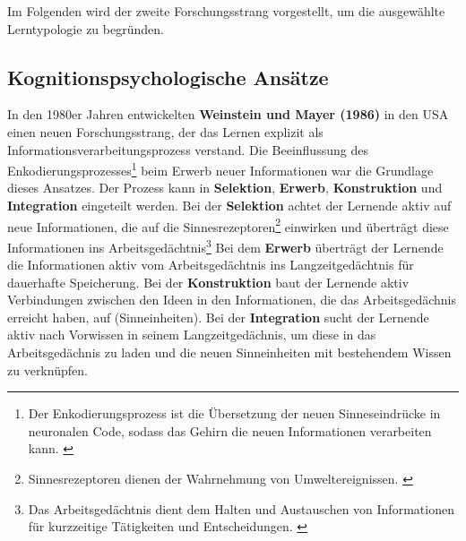         Im Folgenden wird der zweite Forschungsstrang vorgestellt, um die ausgewählte Lerntypologie zu begründen.

        \subsection{Kognitionspsychologische Ansätze }
        In den 1980er Jahren
        entwickelten \textbf{Weinstein und Mayer (1986)} in den USA  einen neuen Forschungsstrang, der das Lernen explizit als Informationsverarbeitungsprozess verstand.
        Die Beeinflussung des  Enkodierungsprozesses\footnote{Der Enkodierungsprozess ist die Übersetzung der neuen Sinneseindrücke in neuronalen Code, sodass das Gehirn die neuen Informationen verarbeiten kann. \parencite[178]{berting.2011}}
        beim Erwerb neuer Informationen war die Grundlage dieses Ansatzes. Der Prozess kann in \textbf{Selektion}, \textbf{Erwerb}, \textbf{Konstruktion} und   \textbf{Integration}  eingeteilt werden.
        Bei der\textbf{ Selektion} achtet der Lernende aktiv auf neue Informationen, die auf die Sinnesrezeptoren\footnote{ Sinnesrezeptoren dienen der Wahrnehmung von Umweltereignissen. \parencite[90]{Roth.1997}}
                einwirken und überträgt diese Informationen ins Arbeitsgedächtnis\footnote{Das Arbeitsgedächtnis dient dem Halten und Austauschen von Informationen für kurzzeitige Tätigkeiten und Entscheidungen. \parencite[290]{Kircher.2007}}
        Bei dem \textbf{Erwerb} überträgt der Lernende die Informationen aktiv vom Arbeitsgedächtnis ins Langzeitgedächtnis für dauerhafte Speicherung.
        Bei der \textbf{Konstruktion} baut der Lernende  aktiv Verbindungen zwischen den Ideen in den Informationen, die das Arbeitsgedächnis erreicht haben, auf (Sinneinheiten).
        Bei der \textbf{Integration} sucht der Lernende aktiv nach Vorwissen in seinem Langzeitgedächnis, um diese in das Arbeitsgedächnis zu laden und die neuen Sinneinheiten mit bestehendem Wissen zu verknüpfen.  \parencite[317]{Weinstein.1986} \parencite[17]{Thielke.2003}
        
